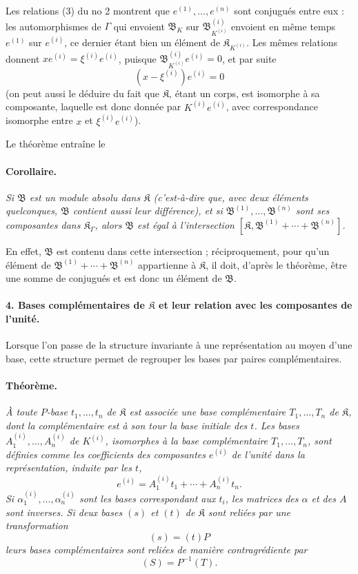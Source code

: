 Les relations (3) du no 2 montrent que $e^{(1)},\ldots,e^{(n)}$ sont conjugués entre eux : les automorphismes de $\Gamma$ qui envoient $\mathfrak B_K$ sur $\mathfrak B_{K^{(i)}}^{(i)}$ envoient en même temps $e^{(1)}$ sur $e^{(i)}$, ce dernier étant bien un élément de $\mathfrak K_{K^{(i)}}$. Les mêmes relations donnent $xe^{(i)}=\xi^{(i)}e^{(i)}$, puisque $\mathfrak B_{K^{(i)}}^{(i)}e^{(i)}=0$, et par suite
\[
(x-\xi^{(i)})e^{(i)}=0
\]
(on peut aussi le déduire du fait que $\mathfrak K$, étant un corps, est isomorphe à sa composante, laquelle est donc donnée par $K^{(i)}e^{(i)}$, avec correspondance isomorphe entre $x$ et $\xi^{(i)}e^{(i)}$).

Le théorème entraîne le

\paragraph{Corollaire.}
\emph{Si $\mathfrak B$ est un module absolu dans $\mathfrak K$ (c'est-à-dire que, avec deux éléments quelconques, $\mathfrak B$ contient aussi leur différence), et si $\mathfrak B^{(1)},\ldots,\mathfrak B^{(n)}$ sont ses composantes dans $\mathfrak K_\Gamma$, alors $\mathfrak B$ est égal à l'intersection $[\mathfrak K,\mathfrak B^{(1)}+\cdots+\mathfrak B^{(n)}]$.}

En effet, $\mathfrak B$ est contenu dans cette intersection ; réciproquement, pour qu'un élément de $\mathfrak B^{(1)}+\cdots+\mathfrak B^{(n)}$ appartienne à $\mathfrak K$, il doit, d'après le théorème, être une somme de conjugués et est donc un élément de $\mathfrak B$.

\paragraph{4. Bases complémentaires de $\mathfrak K$ et leur relation avec les composantes de l'unité.}
Lorsque l'on passe de la structure invariante à une représentation au moyen d'une base, cette structure permet de regrouper les bases par paires complémentaires.

\paragraph{Théorème.}
\emph{À toute $P$-base $t_1,\ldots,t_n$ de $\mathfrak K$ est associée une base complémentaire $T_1,\ldots,T_n$ de $\mathfrak K$, dont la complémentaire est à son tour la base initiale des $t$. Les bases $A_1^{(i)},\ldots,A_n^{(i)}$ de $K^{(i)}$, isomorphes à la base complémentaire $T_1,\ldots,T_n$, sont définies comme les coefficients des composantes $e^{(i)}$ de l'unité dans la représentation, induite par les $t$,
\[
e^{(i)}=A_1^{(i)}t_1+\cdots+A_n^{(i)}t_n.
\]
Si $\alpha_1^{(i)},\ldots,\alpha_n^{(i)}$ sont les bases correspondant aux $t_i$, les matrices des $\alpha$ et des $A$ sont inverses. Si deux bases $(s)$ et $(t)$ de $\mathfrak K$ sont reliées par une transformation
\[
(s)=(t)P
\]
leurs bases complémentaires sont reliées de manière contragrédiente par
\[
(S)=P^{-1}(T).
\]}

